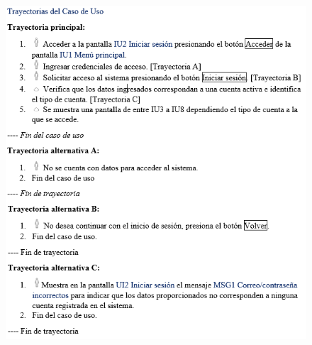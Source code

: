 \documentclass[12pt,letterpaper]{article}
\begin{document}
            \begin{figure}[H]
                \centering
                \includegraphics [scale=0.9]{casosUso/trayectorias}
            \end{figure}
\end{document}
